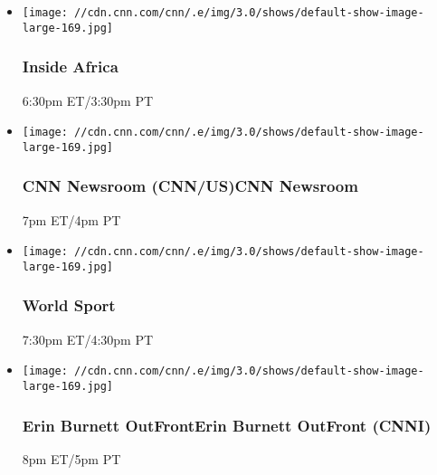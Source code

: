 \begin{itemize}
\item
  \texttt{[image: //cdn.cnn.com/cnn/.e/img/3.0/shows/default-show-image-large-169.jpg]}

  \hypertarget{inside-africa-2}{%
  \subsubsection{Inside Africa}\label{inside-africa-2}}

  6:30pm ET/3:30pm PT
\end{itemize}

\begin{itemize}
\item
  \texttt{[image: //cdn.cnn.com/cnn/.e/img/3.0/shows/default-show-image-large-169.jpg]}

  \hypertarget{cnn-newsroom-cnnuscnn-newsroom--1}{%
  \subsubsection{CNN Newsroom (CNN/US)CNN Newsroom
  }\label{cnn-newsroom-cnnuscnn-newsroom--1}}

  7pm ET/4pm PT
\end{itemize}

\begin{itemize}
\item
  \texttt{[image: //cdn.cnn.com/cnn/.e/img/3.0/shows/default-show-image-large-169.jpg]}

  \hypertarget{world-sport-3}{%
  \subsubsection{World Sport}\label{world-sport-3}}

  7:30pm ET/4:30pm PT
\end{itemize}

\begin{itemize}
\item
  \texttt{[image: //cdn.cnn.com/cnn/.e/img/3.0/shows/default-show-image-large-169.jpg]}

  \hypertarget{erin-burnett-outfronterin-burnett-outfront-cnni--2}{%
  \subsubsection{Erin Burnett OutFrontErin Burnett OutFront (CNNI)
  }\label{erin-burnett-outfronterin-burnett-outfront-cnni--2}}

  8pm ET/5pm PT
\end{itemize}

